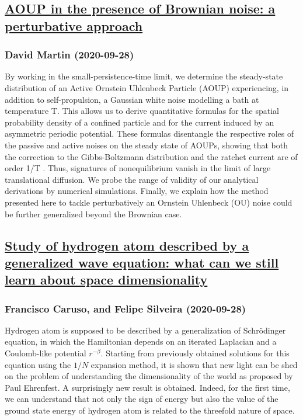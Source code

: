 \subsection*{\href{http://arxiv.org/abs/2009.13476v1}{AOUP in the presence of Brownian noise: a perturbative approach}}
\subsubsection*{David Martin (2020-09-28)}
By working in the small-persistence-time limit, we determine the steady-state
distribution of an Active Ornstein Uhlenbeck Particle (AOUP) experiencing, in
addition to self-propulsion, a Gaussian white noise modelling a bath at
temperature T. This allows us to derive quantitative formulas for the spatial
probability density of a confined particle and for the current induced by an
asymmetric periodic potential. These formulas disentangle the respective roles
of the passive and active noises on the steady state of AOUPs, showing that
both the correction to the Gibbs-Boltzmann distribution and the ratchet current
are of order 1/T . Thus, signatures of nonequilibrium vanish in the limit of
large translational diffusion. We probe the range of validity of our analytical
derivations by numerical simulations. Finally, we explain how the method
presented here to tackle perturbatively an Ornstein Uhlenbeck (OU) noise could
be further generalized beyond the Brownian case.

\subsection*{\href{http://arxiv.org/abs/2009.13473v1}{Study of hydrogen atom described by a generalized wave equation: what  can we still learn about space dimensionality}}
\subsubsection*{Francisco Caruso, and Felipe Silveira (2020-09-28)}
Hydrogen atom is supposed to be described by a generalization of
Schr\"odinger equation, in which the Hamiltonian depends on an iterated
Laplacian and a Coulomb-like potential $r^{-\beta}$. Starting from previously
obtained solutions for this equation using the $1/N$ expansion method, it is
shown that new light can be shed on the problem of understanding the
dimensionality of the world as proposed by Paul Ehrenfest. A surprisingly new
result is obtained. Indeed, for the first time, we can understand that not only
the sign of energy but also the value of the ground state energy of hydrogen
atom is related to the threefold nature of space.

